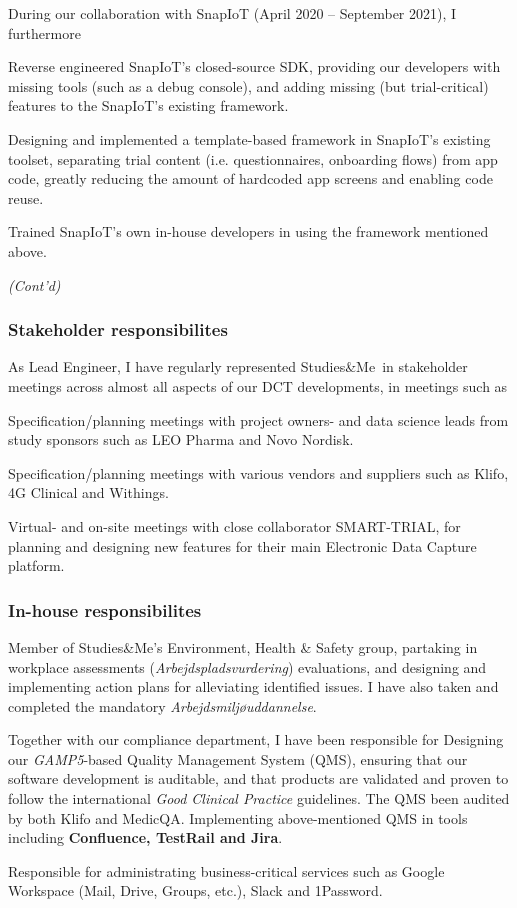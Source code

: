 \documentclass[10pt, a4paper]{article}
\newcommand{\sme}{Studies\&Me}
\begin{document}
During our collaboration with SnapIoT (April 2020 -- September 2021), I furthermore
\begin{outline}
  \1 Reverse engineered SnapIoT's closed-source SDK, providing our developers with missing tools (such as a debug console), and adding missing (but trial-critical) features to the SnapIoT's existing framework.

  \1 Designing and implemented a template-based framework in SnapIoT's existing toolset, separating trial content (i.e. questionnaires, onboarding flows) from app code, greatly reducing the amount of hardcoded app screens and enabling code reuse.
  
  \1 Trained SnapIoT's own in-house developers in using the framework mentioned above.
\end{outline}
\vspace*{\fill}
\textit{(Cont'd)}

\pagebreak

\subsubsection*{Stakeholder responsibilites}
As Lead Engineer, I have regularly represented \sme\ in stakeholder meetings across almost all aspects of our DCT developments, in meetings such as 
\begin{outline}
  \1 Specification/planning meetings with project owners- and data science leads from study sponsors such as LEO Pharma and Novo Nordisk.

  \1 Specification/planning meetings with various vendors and suppliers such as Klifo, 4G Clinical and Withings.

  \1 Virtual- and on-site meetings with close collaborator SMART-TRIAL, for planning and designing new features for their main Electronic Data Capture platform.
\end{outline}
\subsubsection*{In-house responsibilites}
\begin{outline}
  \1 Member of \sme's Environment, Health \& Safety group, partaking in workplace assessments (\textit{Arbejdspladsvurdering}) evaluations, and designing and implementing action plans for alleviating identified issues. I have also taken and completed the mandatory \textit{Arbejdsmiljøuddannelse}.

\1 Together with our compliance department, I have been responsible for
  \2 Designing our \textit{GAMP5}-based Quality Management System (QMS), ensuring that our software development is auditable, and that products are validated and proven to follow the international \textit{Good Clinical Practice} guidelines. The QMS been audited by both Klifo and MedicQA.
  \2 Implementing above-mentioned QMS in tools including \textbf{Confluence, TestRail and Jira}.

\1 Responsible for administrating business-critical services such as Google Workspace (Mail, Drive, Groups, etc.), Slack and 1Password.
\end{outline}
\end{document}
